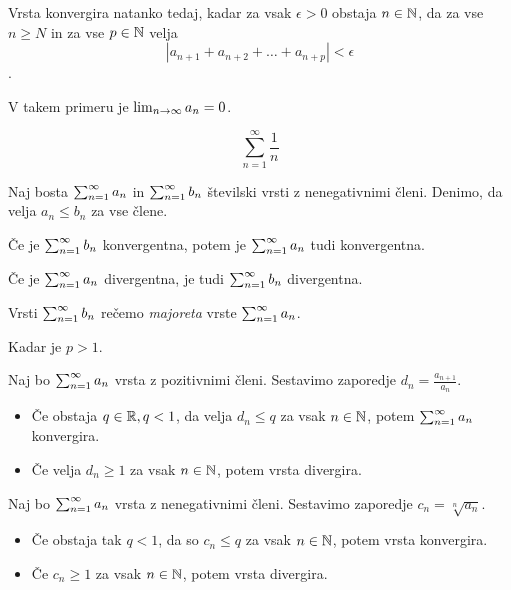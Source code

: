 Vrsta konvergira natanko tedaj, kadar za vsak $\epsilon>0$ obstaja $n \in \mathbb{N}$, da za vse $n \ge N$ in za vse $p \in \mathbb{N}$ velja \[|a_{n+1} + a_{n+2} + \ldots + a_{n+p}| < \epsilon\].

V takem primeru je $\lim_{n\to \infty} a_n = 0$.


\[
	\sum_{n=1}^{\infty} \frac{1}{n}
\]


Naj bosta $\sum_{n=1}^{\infty} a_n$ in $\sum_{n=1}^{\infty} {b}_n$ številski vrsti z nenegativnimi členi. Denimo, da velja $a_n \le b_n$ za vse člene. 

Če je $\sum_{n=1}^{\infty} {b}_n$ konvergentna, potem je $\sum_{n=1}^{\infty} a_n$ tudi konvergentna. 

Če je $\sum_{n=1}^{\infty} a_n$ divergentna, je tudi $\sum_{n=1}^{\infty} {b}_n$ divergentna. 

Vrsti $\sum_{n=1}^{\infty} {b}_n$ rečemo \textit{majoreta} vrste $\sum_{n=1}^{\infty} a_n$.


Kadar je $p > 1$.


Naj bo $\sum_{n=1}^{\infty} a_n$ vrsta z pozitivnimi členi. Sestavimo zaporedje $d_n = \frac{a_{n+1}}{a_n}$.

\begin{itemize}
	\item Če obstaja $q \in \mathbb{R}, q < 1$, da velja $d_n \le q$ za vsak $n \in \mathbb{N}$, potem $\sum_{n=1}^{\infty} a_n$ konvergira.
	\item Če velja $d_n \ge 1$ za vsak $n\in \mathbb{N}$, potem vrsta divergira.
\end{itemize}


Naj bo $\sum_{n=1}^{\infty} a_n$ vrsta z nenegativnimi členi. Sestavimo zaporedje $c_n = \sqrt[n]{a_n}$.
\begin{itemize}
	\item Če obstaja tak $q < 1$, da so $c_n \le q$ za vsak $n \in \mathbb{N}$, potem vrsta konvergira.
	\item Če $c_n \ge 1$ za vsak $n \in \mathbb{N}$, potem vrsta divergira.
\end{itemize}